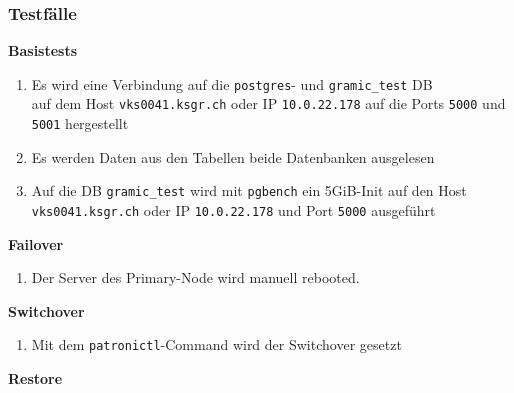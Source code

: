
\begin{flushleft}
    \subsubsection{Testfälle}
    \begin{description}
        \item \textbf{Basistests}\hfill \\
        \begin{enumerate}
            \item Es wird eine Verbindung auf die \texttt{postgres}- und \texttt{gramic\_test} DB\\ auf dem Host \texttt{vks0041.ksgr.ch} oder IP \texttt{10.0.22.178} auf die Ports \texttt{5000} und \texttt{5001} hergestellt
            \item Es werden Daten aus den Tabellen beide Datenbanken ausgelesen
            \item Auf die DB \texttt{gramic\_test} wird mit \texttt{pgbench} ein 5GiB-Init auf den Host \texttt{vks0041.ksgr.ch} oder IP \texttt{10.0.22.178} und Port \texttt{5000} ausgeführt
        \end{enumerate}
        \item \textbf{Failover}\hfill \\
        \begin{enumerate}
            \item Der Server des Primary-Node wird manuell rebooted.
        \end{enumerate}
        \item \textbf{Switchover}\hfill \\
        \begin{enumerate}[resume]
            \item Mit dem \texttt{patronictl}-Command wird der Switchover gesetzt
        \end{enumerate}
        \item \textbf{Restore}\hfill \\

\end{description}
\end{flushleft}
